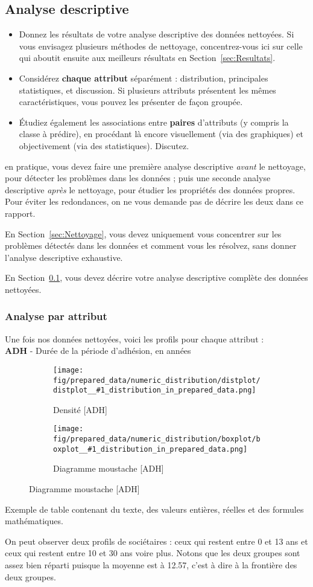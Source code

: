 \documentclass{ceri/sty/rapport}
\newcommand{\figureDistribution}[1]{
\begin{figure}[H]
    \centering
    \begin{subfigure}[t]{0.49\textwidth}
        \texttt{[image: fig/prepared\_data/numeric\_distribution/distplot/distplot\_\_\#1\_distribution\_in\_prepared\_data.png]}
        \caption{Densité [#1]}
        \label{fig:#1_density}
    \end{subfigure}
    \hfill
    \begin{subfigure}[t]{0.49\textwidth}
        \texttt{[image: fig/prepared\_data/numeric\_distribution/boxplot/boxplot\_\_\#1\_distribution\_in\_prepared\_data.png]}
        \caption{Diagramme moustache [#1]}
        \label{fig:#1_boxplot}
    \end{subfigure}
    \label{fig:#1_distribution}
\end{figure}
}
\newcommand{\inputDescription}[1]{
\begin{table}[htb!]
	\centering
	\rowcolors{1}{fgVeryLightRed}{}
	
	\caption[Exemple de table hétérogène]{Exemple de table contenant du texte, des valeurs entières, réelles et des formules mathématiques.}
	\label{tab:exemple}
\end{table}
}
\begin{document}
\subsection{Analyse descriptive}
\label{sec:AnalyseDesc}
\begin{itemize}
	\item Donnez les résultats de votre analyse descriptive des données nettoyées. Si vous envisagez plusieurs méthodes de nettoyage, concentrez-vous ici sur celle qui aboutit ensuite aux meilleurs résultats en Section~\ref{sec:Resultats}.
	\item Considérez \textbf{chaque attribut} séparément : distribution, principales statistiques, et discussion. Si plusieurs attributs présentent les mêmes caractéristiques, vous pouvez les présenter de façon groupée.
	\item Étudiez également les associations entre \textbf{paires} d'attributs (y compris la classe à prédire), en procédant là encore visuellement (via des graphiques) et objectivement (via des statistiques). Discutez.
\end{itemize}

\begin{beware}[Remarque]
en pratique, vous devez faire une première analyse descriptive \textit{avant} le nettoyage, pour détecter les problèmes dans les données ; puis une seconde analyse descriptive \textit{après} le nettoyage, pour étudier les propriétés des données propres. Pour éviter les redondances, on ne vous demande pas de décrire les deux dans ce rapport.

En Section~\ref{sec:Nettoyage}, vous devez uniquement vous concentrer sur les problèmes détectés dans les données et comment vous les résolvez, sans donner l'analyse descriptive exhaustive.

En Section~\ref{sec:AnalyseDesc}, vous devez décrire votre analyse descriptive complète des données nettoyées.
\end{beware}

\subsubsection{Analyse par attribut}
Une fois nos données nettoyées, voici les profils pour chaque attribut :\\


\textbf{ADH} - Durée de la période d’adhésion, en années
\figureDistribution{ADH}
\inputDescription{ADH}
On peut observer deux profils de sociétaires : ceux qui restent entre 0 et 13 ans et ceux qui restent entre 10 et 30 ans voire plus.
Notons que les deux groupes sont assez bien réparti puisque la moyenne est à 12.57, c'est à dire à la frontière des deux groupes.\\
\end{document}
